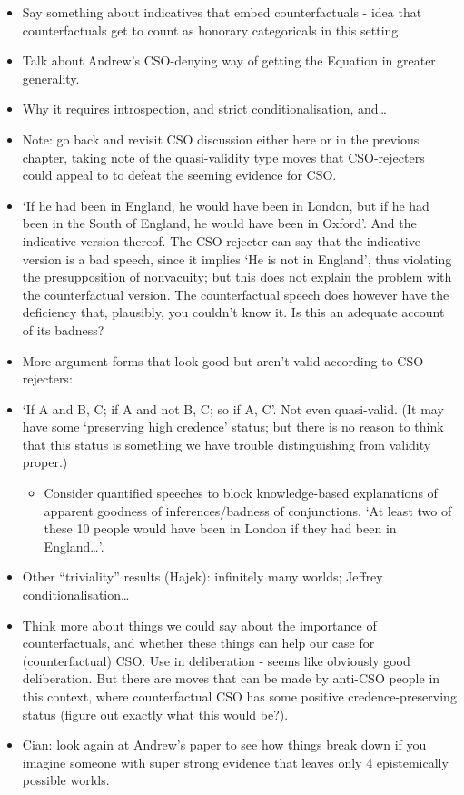\documentclass[leqno, 11pt, a5paper, openany]{article}
\begin{document}
\begin{itemize}
\item
  Say something about indicatives that embed counterfactuals - idea that
  counterfactuals get to count as honorary categoricals in this setting.
\item
  Talk about Andrew's CSO-denying way of getting the Equation in greater
  generality.
\item
  Why it requires introspection, and strict conditionalisation,
  and\ldots{}
\item
  Note: go back and revisit CSO discussion either here or in the
  previous chapter, taking note of the quasi-validity type moves that
  CSO-rejecters could appeal to to defeat the seeming evidence for
  CSO.\\
\item
  ‘If he had been in England, he would have been in London, but if he
  had been in the South of England, he would have been in Oxford’. And
  the indicative version thereof. The CSO rejecter can say that the
  indicative version is a bad speech, since it implies ‘He is not in
  England’, thus violating the presupposition of nonvacuity; but this
  does not explain the problem with the counterfactual version. The
  counterfactual speech does however have the deficiency that,
  plausibly, you couldn't know it. Is this an adequate account of its
  badness?\\
\item
  More argument forms that look good but aren't valid according to CSO
  rejecters:
\item
  ‘If A and B, C; if A and not B, C; so if A, C’. Not even quasi-valid.
  (It may have some ‘preserving high credence’ status; but there is no
  reason to think that this status is something we have trouble
  distinguishing from validity proper.)

  \begin{itemize}
    \item
    Consider quantified speeches to block knowledge-based explanations
    of apparent goodness of inferences/badness of conjunctions. ‘At
    least two of these 10 people would have been in London if they had
    been in England\ldots{}’.
  \end{itemize}
\item
  Other “triviality” results (Hajek): infinitely many worlds; Jeffrey
  conditionalisation\ldots{}
\item
  Think more about things we could say about the importance of
  counterfactuals, and whether these things can help our case for
  (counterfactual) CSO. Use in deliberation - seems like obviously good
  deliberation. But there are moves that can be made by anti-CSO people
  in this context, where counterfactual CSO has some positive
  credence-preserving status (figure out exactly what this would be?).
\item
  Cian: look again at Andrew's paper to see how things break down if you
  imagine someone with super strong evidence that leaves only 4
  epistemically possible worlds.
\end{itemize}
\end{document}
